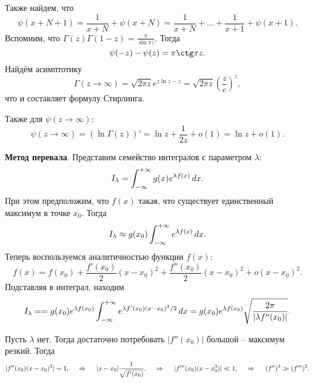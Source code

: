 Также найдем, что
\begin{equation*}
    \psi(x + N + 1) = \frac{1}{x + N} + \psi(x+ N) = \frac{1}{x+N} + \ldots + \frac{1}{x+1} + \psi(x+1).
\end{equation*}
Вспомним, что $\Gamma(z) \Gamma(1-z) = \frac{\pi}{\sin \pi z}$. Тогда
\begin{equation*}
    \psi(-z) - \psi(z) = \pi \ctg \pi z.
\end{equation*}
Найдём асимптотику 
\begin{equation*}
    \Gamma(z \to \infty) = \sqrt{2 \pi z} e^{z \ln z - z} = \sqrt{2 \pi z} \left(\frac{z}{e}\right)^{z},
\end{equation*}
что и составляет формулу Стирлинга. 

Также для $\psi(z\to \infty)$:
\begin{equation*}
    \psi(z\to \infty) = \left(\ln \Gamma(z)\right)' = \ln z + \frac{1}{2z} + o(1) = \ln z + o(1).
\end{equation*}




\textbf{Метод перевала}.  Представим семейство интегралов с параметром $\lambda$:
\begin{equation*}
    I_\lambda = \int_{-\infty}^{+\infty} g(x) e^{\lambda f(x)} \, d x.
\end{equation*}
При этом предположим, что $f(x)$ такая, что существует единственный максимум в точке $x_0$. Тогда
\begin{equation*}
    I_\lambda \approx g(x_0) \int_{-\infty}^{+\infty} e^{\lambda f(x)} \, d x.
\end{equation*}
Теперь воспользуемся аналитичностью функции $f(x)$:
\begin{equation*}
    f(x) = f(x_0) + \frac{f'(x_0)}{2} (x-x_0)^2 + \frac{f''(x_0)}{2} (x-x_0)^2 + o(x-x_0)^2.
\end{equation*}
Подставляя в интеграл, находим
\begin{equation*}
    I_\lambda= = g(x_0) e^{\lambda f(x_0)} \int_{-\infty}^{+\infty} e^{\lambda f'(x_0) (x-x_0)^2/2} \, d x = g(x_0) e^{\lambda f(x_0)} \sqrt{\frac{2\pi}{|\lambda f'' (x_0) |}}.
\end{equation*}

Пусть $\lambda$ нет. Тогда достаточно потребовать $|f''(x_0)|$ большой -- максимум резкий. 
Тогда
\begin{equation*}
    |f''(x_0) (x-x_0)^2| \sim 1,
    \hspace{0.5cm} \Rightarrow \hspace{0.5cm}   
    |x-x_0| \frac{1}{\sqrt{f'(x_0)}},
    \hspace{0.5cm} \Rightarrow \hspace{0.5cm}   
    |f'''(x_0) (x-x_0^3)| \ll 1,
    \hspace{0.5cm} \Rightarrow \hspace{0.5cm}
    (f'')^3 \gg (f''')^2.
\end{equation*}


